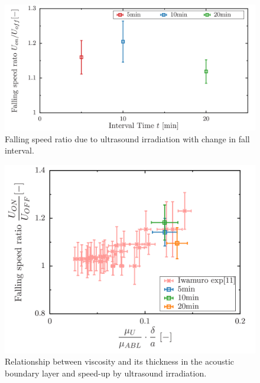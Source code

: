 \begin{figure}[ht]
    \begin{center}
        \includegraphics[width=13cm,clip]{5-Discussion/diff.png}
        \caption{Falling speed ratio due to ultrasound irradiation with change in fall interval.}
        \label{fig:speed-diff}
    \end{center}
\end{figure}

\begin{figure}[ht]
    \begin{center}
        \includegraphics[width=13cm,clip]{5-Discussion/diff-iwamuro.png}
        \caption{Relationship between viscosity and its thickness in the acoustic boundary layer and speed-up by ultrasound irradiation.}
        \label{fig:speed-diff-iwamuro}
    \end{center}
\end{figure}